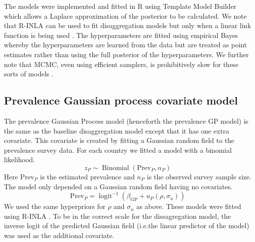 \documentclass{statsoc}
\begin{document}
The models were implemented and fitted in R \citep{R} using Template Model Builder \citep{TMB} which allows a Laplace approximation of the posterior to be calculated.
We note that R-INLA \citep{INLA} can be used to fit disaggregation models but only when a linear link function is being used \citep{wilson2017pointless}.
The hyperparameters are fitted using empirical Bayes whereby the hyperparameters are learned from the data but are treated as point estimates rather than using the full posterior of the hyperparameters.
We further note that MCMC, even using efficient samplers, is prohibitively slow for these sorts of models \citep{nandi2020disaggregation}. 


%
%
%
%
%
%
%

\subsection*{Prevalence Gaussian process covariate model}

The prevalence Gaussian Process model (henceforth the prevalence GP model) is the same as the baseline disaggregation model except that it has one extra covariate.
This covariate is created by fitting a Gaussian random field to the prevalence survey data.
For each country we fitted a model with a binomial likelihood.
$$z_P \sim \operatorname{Binomial}(\mathrm{Prev}_P, n_P) $$
Here $\mathrm{Prev}_P$ is the estimated prevalence and $n_P$ is the observed survey sample size. 
The model only depended on a Gaussian random field having no covariates.
$$\mathrm{Prev}_P = \operatorname{logit}^{-1}(\beta_\mathrm{GP} + u_P(\rho, \sigma_u))$$
We used the same hyperpriors for $\rho$ and $\sigma_u$ as above. 
These models were fitted using R-INLA \citep{INLA}.
To be in the correct scale for the dissagregation model, the inverse logit of the predicted Gaussian field (i.e.\thinspace the linear predictor of the model) was used as the additional covariate.
\end{document}
